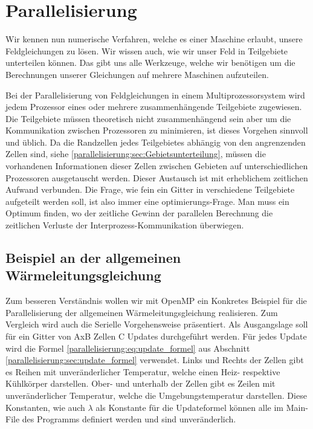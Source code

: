 %
%
%
%
\section{Parallelisierung
	\label{parallelisierung:sec:Parallelisierung}}
Wir kennen nun numerische Verfahren, welche es einer Maschine erlaubt, unsere Feldgleichungen zu lösen.
Wir wissen auch, wie wir unser Feld in Teilgebiete unterteilen können.
Das gibt uns alle Werkzeuge, welche wir benötigen um die Berechnungen unserer Gleichungen auf mehrere Maschinen aufzuteilen.

Bei der Parallelisierung von Feldgleichungen in einem Multiprozessorsystem wird jedem Prozessor eines oder mehrere zusammenhängende Teilgebiete zugewiesen.
Die Teilgebiete müssen theoretisch nicht zusammenhängend sein aber um die Kommunikation zwischen Prozessoren zu minimieren, ist dieses Vorgehen sinnvoll und üblich.
Da die Randzellen jedes Teilgebietes abhängig von den angrenzenden Zellen sind, siehe \ref{parallelisierung:sec:Gebietsunterteilung}, müssen die vorhandenen Informationen dieser Zellen zwischen Gebieten auf unterschiedlichen Prozessoren ausgetauscht werden.
Dieser Austausch ist mit erheblichem zeitlichen Aufwand verbunden.
Die Frage, wie fein ein Gitter in verschiedene Teilgebiete aufgeteilt werden soll, ist also immer eine optimierungs-Frage.
Man muss ein Optimum finden, wo der zeitliche Gewinn der parallelen Berechnung die zeitlichen Verluste der Interprozess-Kommunikation überwiegen.




\subsection{Beispiel an der allgemeinen Wärmeleitungsgleichung
	\label{parallelisierung:sub:BeispielParallelisierung}}
Zum besseren Verständnis wollen wir mit OpenMP ein Konkretes Beispiel für die Parallelisierung der allgemeinen Wärmeleitungsgleichung realisieren.
Zum Vergleich wird auch die Serielle Vorgehensweise präsentiert.
Als Ausgangslage soll für ein Gitter von AxB Zellen C Updates durchgeführt werden.
Für jedes Update wird die Formel \ref{parallelisierung:eq:update_formel} aus Abschnitt \ref{parallelisierung:sec:update_formel} verwendet.
Links und Rechts der Zellen gibt es Reihen mit unveränderlicher Temperatur, welche einen Heiz- respektive Kühlkörper darstellen.
Ober- und unterhalb der Zellen gibt es Zeilen mit unveränderlicher Temperatur, welche die Umgebungstemperatur darstellen.
Diese Konstanten, wie auch $\lambda$ als Konstante für die Updateformel können alle im Main-File des Programms definiert werden und sind unveränderlich.

